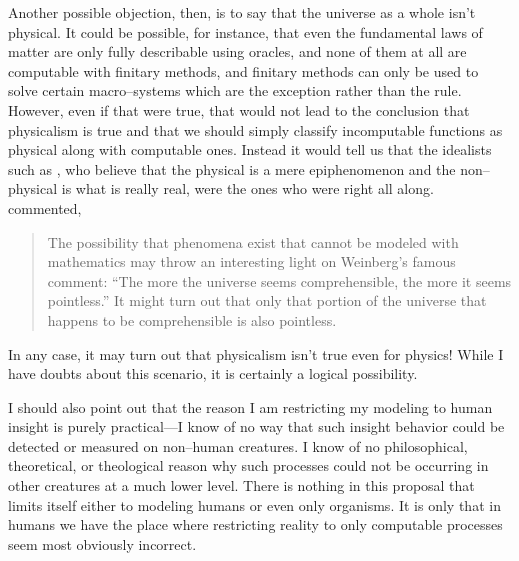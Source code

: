 Another possible objection, then, is to say that the universe as a whole isn't physical.  It could be possible, for instance, that even the fundamental laws of matter are only fully describable using oracles, and none of them at all are computable with finitary methods, and finitary methods can only be used to solve certain macro--systems which are the exception rather than the rule.  However, even if that were true, that would not lead to the conclusion that physicalism is true and that we should simply classify incomputable functions as physical along with computable ones.  Instead it would tell us that the idealists such as \citet{henry2005}, who believe that the physical is a mere epiphenomenon and the non--physical is what is really real, were the ones who were right all along.  \citet{robertson1999} commented,

\begin{quote}
The possibility that phenomena exist that cannot be modeled with mathematics may throw an interesting light on Weinberg's famous comment: ``The more the universe seems comprehensible, the more it seems pointless.'' It might turn out that only that portion of the universe that happens to be comprehensible is also pointless.
\end{quote}

In any case, it may turn out that physicalism isn't true even for physics!  While I have doubts about this scenario, it is certainly a logical possibility.

I should also point out that the reason I am restricting my modeling to human insight is purely practical---I know of no way that such insight behavior could be detected or measured on non--human creatures.  I know of no philosophical, theoretical, or theological reason why such processes could not be occurring in other creatures at a much lower level.  There is nothing in this proposal that limits itself either to modeling humans or even only organisms.  It is only that in humans we have the place where restricting reality to only computable processes seem most obviously incorrect.




